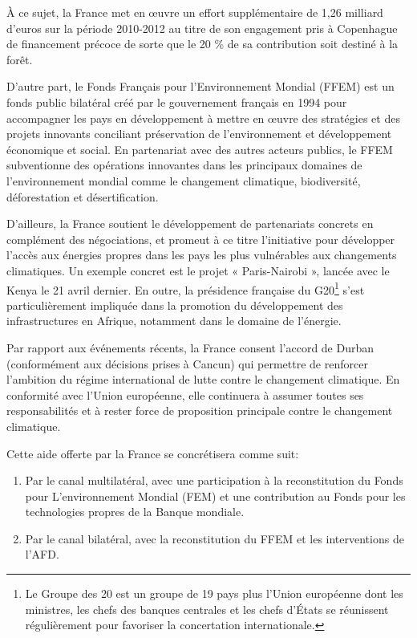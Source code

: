 \documentclass[a4paper,10pt]{article}
\begin{document}
À ce sujet, la France met en œuvre un effort supplémentaire de 1,26 milliard d’euros sur la période 2010-2012 au titre de son engagement pris à Copenhague de financement précoce de sorte que le 20 \% de sa contribution soit destiné à la forêt.

D’autre part, le Fonds Français pour l'Environnement Mondial (FFEM) est un fonds public bilatéral créé par le gouvernement français en 1994 pour accompagner les pays en développement à mettre en œuvre des stratégies et des projets innovants conciliant préservation de l’environnement et développement économique et social. En partenariat avec des autres acteurs publics, le FFEM subventionne des opérations innovantes dans les principaux domaines de l’environnement mondial comme le changement climatique, biodiversité, déforestation et désertification.

D’ailleurs, la France soutient le développement de partenariats concrets en complément des négociations, et promeut à ce titre l’initiative pour développer l'accès aux énergies propres dans les pays les plus vulnérables aux changements climatiques. Un exemple concret est le projet « Paris-Nairobi », lancée avec le Kenya le 21 avril dernier. En outre, la présidence française du G20\footnote{Le Groupe des 20 est un groupe de 19 pays plus l'Union européenne dont les ministres, les chefs des banques centrales et les chefs d'États se réunissent régulièrement pour favoriser la concertation internationale.} s’est particulièrement impliquée dans la promotion du développement des infrastructures en Afrique, notamment dans le domaine de l’énergie. 

Par rapport aux événements récents, la France consent l'accord de Durban (conformément aux décisions prises à Cancun) qui permettre de renforcer l’ambition du régime international de lutte contre le changement climatique. En conformité avec l’Union européenne, elle continuera à assumer toutes ses responsabilités et à rester force de proposition principale contre le changement climatique. 

Cette aide offerte par la France se concrétisera comme suit:
\begin{enumerate}
\item Par le canal multilatéral, avec une participation à la reconstitution du Fonds pour L'environnement Mondial (FEM) et une contribution au Fonds pour les technologies propres de la Banque mondiale.
\item Par le canal bilatéral, avec la reconstitution du FFEM et les interventions de l’AFD.
\end{enumerate}
\end{document}
